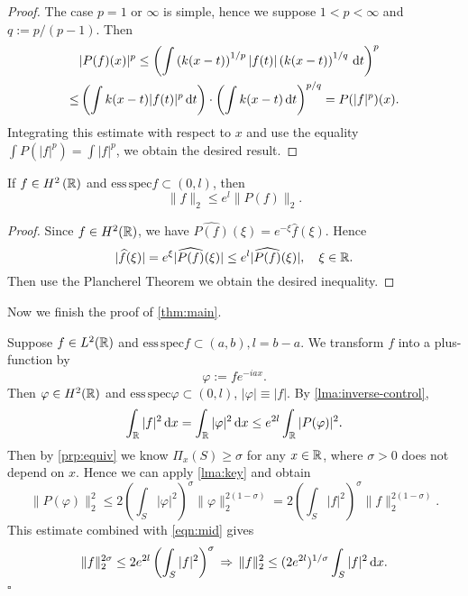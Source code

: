 \begin{proof}
	The case $p=1$ or $\infty$ is simple, hence we suppose $1<p<\infty$ and $q:=p /(p-1)$. Then
	 \begin{align*}
		&|P(f)(x)|^{p}\le \left(\int \left( k(x-t) \right)^{1 /p}|f(t)|\left( k(x-t) \right) ^{1 /q}\,\mathrm{d} t \right)^{p}\\
		 \le & \left( \int k(x-t)|f(t)|^{p}\,\mathrm{d} t \right) \cdot \left( \int k(x-t) \,\mathrm{d} t \right) ^{p /q}=P(|f|^{p})(x)
	.\end{align*}
	Integrating this estimate with respect to $x$ and use the equality $\int P(|f|^{p})=\int |f|^{p}$, we obtain the desired result.
\end{proof}
\begin{lemma}\label{lma:inverse-control}
	If $f\in H^2\left( \mathbb{R} \right) $ and $\mathrm{ess}\,\mathrm{spec} f\subset (0,l)$, then
	\begin{equation}
		\|f\|_2\le e^{l}\|P(f)\|_2.
	\end{equation}
\end{lemma} 

\begin{proof}
	Since $f\in H^2(\mathbb{R})$, we have $\widehat{P(f)}(\xi)=e^{-\xi}\widehat{f}(\xi)$. Hence
	\begin{equation}
		|\widehat{f}(\xi)|=e^{\xi}|\widehat{P(f)}(\xi)|\le e^{l}|\widehat{P(f)}(\xi)|,\quad \xi \in \mathbb{R}.
	\end{equation}
	Then use the Plancherel Theorem we obtain the desired inequality.
\end{proof}



Now we finish the proof of \cref{thm:main}.

 Suppose $f\in  L^2(\mathbb{R})$ and $\mathrm{ess}\,\mathrm{spec} f \subset (a,b),l=b-a$. We transform $f$ into a plus-function by
\[
\varphi:=f e^{-i a x}.
\] 
Then $\varphi \in H^2(\mathbb{R})$ and $\mathrm{ess}\,\mathrm{spec}\varphi \subset (0,l)$, $|\varphi|\equiv |f|$. By \cref{lma:inverse-control},
\begin{equation}\label{eqn:mid}
\int_{\mathbb{R}}|f|^2\,\mathrm{d} x=\int_{\mathbb{R}}|\varphi|^2\,\mathrm{d} x \le e^{2l}\int_{\mathbb{R}}|P(\varphi)|^2. 
\end{equation}
Then by \cref{prp:equiv}  we know $\Pi_x(S)\ge \sigma$ for any $x\in \mathbb{R}$, where $\sigma>0$ does not depend on $x$. Hence we can apply \cref{lma:key} and obtain
\[
\|P(\varphi)\|_2^2\le 2\left( \int_S|\varphi|^2 \right) ^{\sigma}\|\varphi\|_2^{2(1-\sigma)}=2\left( \int_S|f|^2 \right) ^{\sigma} \|f\|_2^{2(1-\sigma)}.
\]
This estimate combined with \cref{eqn:mid} gives 
\[
\|f\|_{2}^{2\sigma}\le 2 e^{2l}\left( \int_S |f|^2 \right) ^{\sigma} \,\Rightarrow \, \|f\|_2^2\le (2e^{2l})^{1 /\sigma}\int_S|f|^2 \,\mathrm{d} x.
\] \hfill $\square$




















